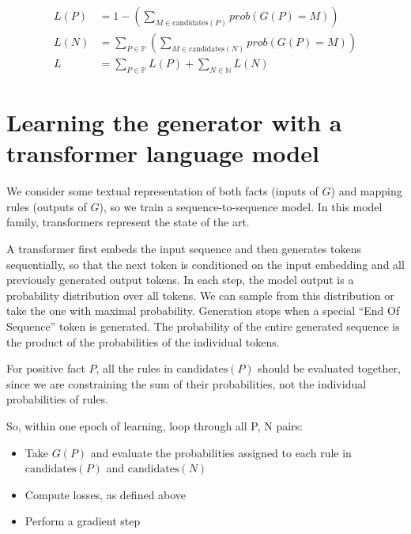 \documentclass{easychair}
\begin{document}
\begin{align*}
L(P) & = 1 - \left(\sum_{M \in \mbox{candidates}(P)} prob(G(P) = M)\right) \\
L(N) & = \sum_{P \in \mathbb{P}} \left(\sum_{M \in \mbox{candidates}(N)} prob(G(P) = M)\right) \\
L & = \sum_{P \in \mathbb{P}} L(P) + \sum_{N \in \mathbb{N}} L(N)
\end{align*}

\section{Learning the generator with a transformer language model}

We consider some textual representation of both facts (inputs of $G$)
and mapping rules (outputs of $G$), so we train a sequence-to-sequence
model. In this model family, transformers represent the state of the
art.

A transformer first embeds the input sequence and then generates
tokens sequentially, so that the next token is conditioned on the
input embedding and all previously generated output tokens. In each
step, the model output is a probability distribution over all
tokens. We can sample from this distribution or take the one with
maximal probability. Generation stops when a special ``End Of
Sequence'' token is generated.  The probability of the entire
generated sequence is the product of the probabilities of the
individual tokens.

For positive fact $P$, all the rules in $\mbox{candidates}(P)$ should
be evaluated together, since we are constraining the sum of their
probabilities, not the individual probabilities of rules.

So, within one epoch of learning, loop through all P, N pairs:
\begin{itemize}
\item Take $G(P)$ and evaluate the probabilities assigned to each rule in $\mbox{candidates}(P)$ and $\mbox{candidates}(N)$
\item Compute losses, as defined above
\item Perform a gradient step
\end{itemize}



\end{document}
